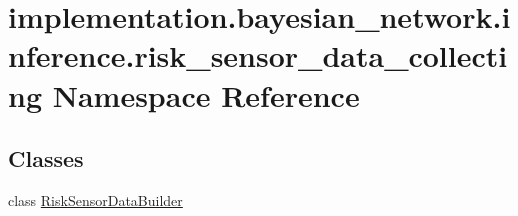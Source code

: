 \hypertarget{namespaceimplementation_1_1bayesian__network_1_1inference_1_1risk__sensor__data__collecting}{}\section{implementation.\+bayesian\+\_\+network.\+inference.\+risk\+\_\+sensor\+\_\+data\+\_\+collecting Namespace Reference}
\label{namespaceimplementation_1_1bayesian__network_1_1inference_1_1risk__sensor__data__collecting}
\subsection*{Classes}
\begin{DoxyCompactItemize}
\item 
class \hyperlink{classimplementation_1_1bayesian__network_1_1inference_1_1risk__sensor__data__collecting_1_1_risk_sensor_data_builder}{Risk\+Sensor\+Data\+Builder}
\end{DoxyCompactItemize}
